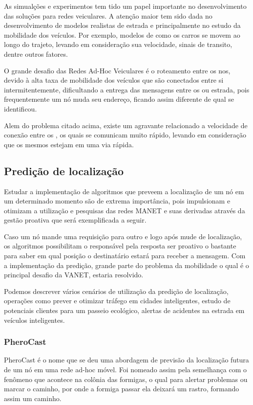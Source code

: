 \documentclass[12pt, %
openright, 
oneside,
a4paper,
brazil]{facom-ufu-abntex2}
\begin{document}
As simualções e experimentos tem tido um papel importante no desenvolvimento das soluções para redes veiculares. A atenção maior tem sido dada no desenvolvimento de modelos realistas de estrada e principalmente no estudo da mobilidade dos veículos. Por exemplo, modelos de como os carros se movem ao longo do trajeto, levando em consideração sua velocidade, sinais de transito, dentre outros fatores. 

O grande desafio das Redes Ad-Hoc Veiculares é o roteamento entre os nos, devido à alta taxa de mobilidade dos veículos que são conectados entre si intermitentemente, dificultando a entrega das mensagens entre os  ou estrada, pois frequentemente um nó muda seu endereço, ficando assim diferente de qual se identificou.

Alem do problema citado acima, existe um agravante relacionado a velocidade de conexão entre os , os quais se comunicam muito rápido, levando em consideração que os mesmos estejam em uma via rápida.

\subsection{Predição de localização}
Estudar a implementação de algoritmos que preveem a localização de um nó em um determinado momento são  de extrema importância, pois impulsionam  e otimizam a  utilização e pesquisas das redes MANET e suas derivadas através da gestão proativa que será exemplificada a seguir.  \cite{6838650}

Caso um nó mande uma requisição para outro e logo após mude de localização, os algoritmos possibilitam o responsável pela resposta ser proativo o bastante para saber em qual posição o destinatário estará para receber a mensagem. Com a implementação da predição, grande parte do problema da mobilidade o qual é o principal desafio da VANET, estaria resolvido.

Podemos descrever vários cenários de utilização da predição de localização, operações como prever e otimizar tráfego em cidades inteligentes, estudo de potenciais clientes para um passeio ecológico, alertas de acidentes na estrada em veículos inteligentes.

\subsubsection{PheroCast}
PheroCast é o nome que se deu uma abordagem de previsão da localização futura de um nó em uma rede ad-hoc móvel. Foi nomeado assim pela semelhança com o fenômeno que acontece na colônia das formigas, o qual para alertar problemas ou marcar o caminho, por onde a formiga passar ela deixará um rastro, formando assim um caminho.
\end{document}
